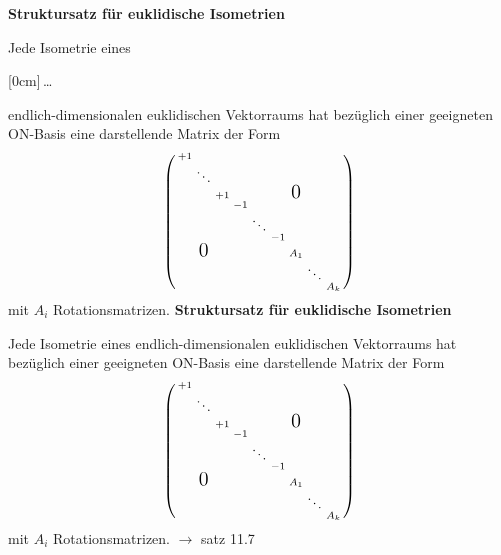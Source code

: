 \documentclass[11pt]{article}
\renewcommand{\cite}[1]{\par\bigskip\hfill{\color{gray}\tiny\(\to\) #1}}
\newcommand{\hide}[1]{\parbox{0cm}{\raisebox{-7pt}[0cm]{\dots}}\color{white}#1\color{black}}
\let\olddots\dots
\renewcommand{\dots}{\,\olddots\,}
\newenvironment{field}{}{\newpage}
\newif\ifnote
\newenvironment{note}{\notetrue}{\notefalse}
\newcommand{\localtag}{}
\newcommand{\globaltag}{}
\newcommand{\uuid}{}
\newcommand{\tags}[1]{
    \ifnote
        \renewcommand{\localtag}{#1}
    \else
        \renewcommand{\globaltag}{#1}
    \fi
    }
\newcommand{\xplain}[1]{\renewcommand{\uuid}{#1}}
\begin{document}
\begin{note}
    \renewcommand{\cite}[1]{\bigskip\hfill{\color{gray}\tiny\(\to\) #1}}
    \tags{Satz}
    \xplain{b2f42114-c30d-11ec-9d64-0242ac120002}
    \begin{field}
        \textbf{Struktursatz für euklidische Isometrien}

        Jede Isometrie eines \hide{endlich-dimensionalen} euklidischen Vektorraums hat bezüglich einer geeigneten ON-Basis eine darstellende Matrix der Form
        \[\left(\begin{smallmatrix}
            +1 \\
              & \ddots \\
              &        & +1 &  &       &  &     \mbox{\Large 0}\\
              &        &    &-1\\
              &        &    &  &\ddots\\
              &        &    &  &       &-1\\
              &\mbox{\Large 0}&    &  &       &  & A_1\\
              &        &    &  &       &  &     &\ddots\\
              &        &    &  &       &  &     &       & A_k\\
        \end{smallmatrix}\right)\]
        mit \(A_i\) Rotationsmatrizen.
    \end{field}
    \begin{field}
        \textbf{Struktursatz für euklidische Isometrien}

        Jede Isometrie eines endlich-dimensionalen euklidischen Vektorraums hat bezüglich einer geeigneten ON-Basis eine darstellende Matrix der Form
        \[\left(\begin{smallmatrix}
            +1 \\
              & \ddots \\
              &        & +1 &  &       &  &     \mbox{\Large 0}\\
              &        &    &-1\\
              &        &    &  &\ddots\\
              &        &    &  &       &-1\\
              &\mbox{\Large 0}&    &  &       &  & A_1\\
              &        &    &  &       &  &     &\ddots\\
              &        &    &  &       &  &     &       & A_k\\
        \end{smallmatrix}\right)\]
        mit \(A_i\) Rotationsmatrizen.
        \cite{satz 11.7}
    \end{field}


\end{note}
\end{document}
